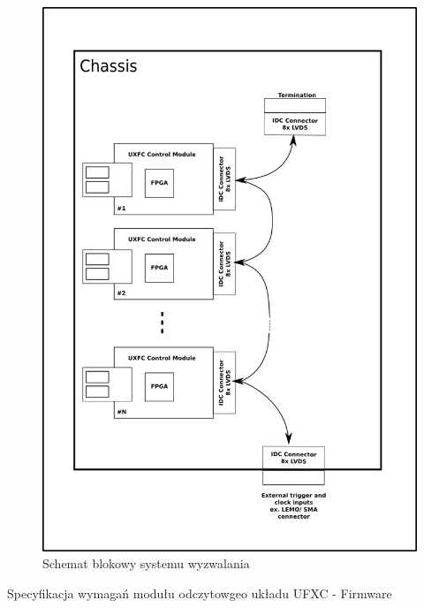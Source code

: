 \documentclass[a4paper,11pt,oneside]{article}  %
\begin{document}
\begin{figure}[!h]
	\centering
	\includegraphics[width=16cm]{trigger_sync.png}
	\caption{Schemat blokowy systemu wyzwalania}
	\label{fig:SYS}
\end{figure}


\begin{thebibliography}{9}
 Specyfikacja wymagań modułu odczytowgeo układu UFXC - Firmware

	


\end{thebibliography}
\end{document}
